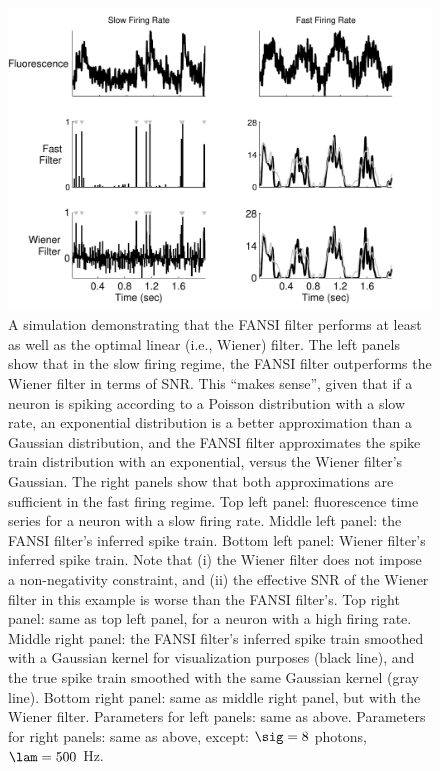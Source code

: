 \begin{figure}[H]
\centering \includegraphics[width=.9\linewidth]{../figs/wiener}
\caption{A simulation demonstrating that the FANSI filter performs at least as well as the optimal linear (i.e., Wiener) filter. The left panels show that in the slow firing regime, the FANSI filter outperforms the Wiener filter in terms of SNR.  This ``makes sense'', given that if a neuron is spiking according to a Poisson distribution with a slow rate, an exponential distribution is a better approximation than a Gaussian distribution, and the FANSI filter approximates the spike train distribution with an exponential, versus the Wiener filter's Gaussian. The right panels show that both approximations are sufficient in the fast firing regime. Top left panel: fluorescence time series for a neuron with a slow firing rate.  Middle left panel: the FANSI filter's inferred spike train.  Bottom left panel: Wiener filter's inferred spike train.  Note that (i) the Wiener filter does not impose a non-negativity constraint, and (ii) the effective SNR of the Wiener filter in this example is worse than the FANSI filter's.  Top right panel: same as top left panel, for a neuron with a high firing rate.  Middle right panel: the FANSI filter's inferred spike train smoothed with a Gaussian kernel for visualization purposes (black line), and the true spike train smoothed with the same Gaussian kernel (gray line).  Bottom right panel: same as middle right panel, but with the Wiener filter. Parameters for left panels: same as above.  Parameters for right panels: same as above, except: $\sig=8$ photons, $\lam=500$ Hz.} \label{fig:wiener}
\end{figure}



